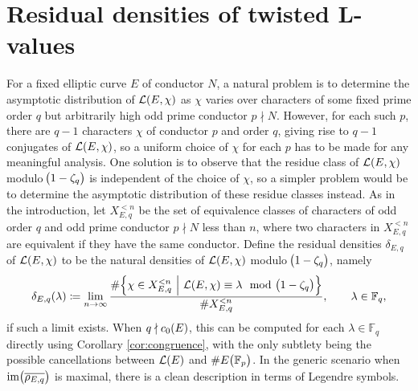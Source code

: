 \documentclass{article}
\theoremstyle{plain}
\theoremstyle{definition}
\newcommand{\FF}{\mathbb{F}}
\newcommand{\im}{\operatorname{im}}
\newcommand{\LLL}{\mathcal{L}}
\newcommand{\br}{\!\del}
\newcommand{\st}{\ \middle| \ }
\begin{document}
\pagebreak

\section{Residual densities of twisted L-values}

\label{sec:density}

For a fixed elliptic curve $ E $ of conductor $ N $, a natural problem is to determine the asymptotic distribution of $ \LLL\br{E, \chi} $ as $ \chi $ varies over characters of some fixed prime order $ q $ but arbitrarily high odd prime conductor $ p \nmid N $. However, for each such $ p $, there are $ q - 1 $ characters $ \chi $ of conductor $ p $ and order $ q $, giving rise to $ q - 1 $ conjugates of $ \LLL\br{E, \chi} $, so a uniform choice of $ \chi $ for each $ p $ has to be made for any meaningful analysis. One solution is to observe that the residue class of $ \LLL\br{E, \chi} $ modulo $ \br{1 - \zeta_q} $ is independent of the choice of $ \chi $, so a simpler problem would be to determine the asymptotic distribution of these residue classes instead. As in the introduction, let $ X_{E, q}^{< n} $ be the set of equivalence classes of characters of odd order $ q $ and odd prime conductor $ p \nmid N $ less than $ n $, where two characters in $ X_{E, q}^{< n} $ are equivalent if they have the same conductor. Define the residual densities $ \delta_{E, q} $ of $ \LLL\br{E, \chi} $ to be the natural densities of $ \LLL\br{E, \chi} $ modulo $ \br{1 - \zeta_q} $, namely
$$ \delta_{E, q}\br{\lambda} \coloneqq \lim_{n \to \infty} \dfrac{\#\cbr{\chi \in X_{E, q}^{< n} \st \LLL\br{E, \chi} \equiv \lambda \mod \br{1 - \zeta_q}}}{\#X_{E, q}^{< n}}, \qquad \lambda \in \FF_q, $$
if such a limit exists. When $ q \nmid c_0\br{E} $, this can be computed for each $ \lambda \in \FF_q $ directly using Corollary \ref{cor:congruence}, with the only subtlety being the possible cancellations between $ \LLL\br{E} $ and $ \#E\br{\FF_p} $. In the generic scenario when $ \im\br{\overline{\rho_{E, q}}} $ is maximal, there is a clean description in terms of Legendre symbols.
\end{document}
